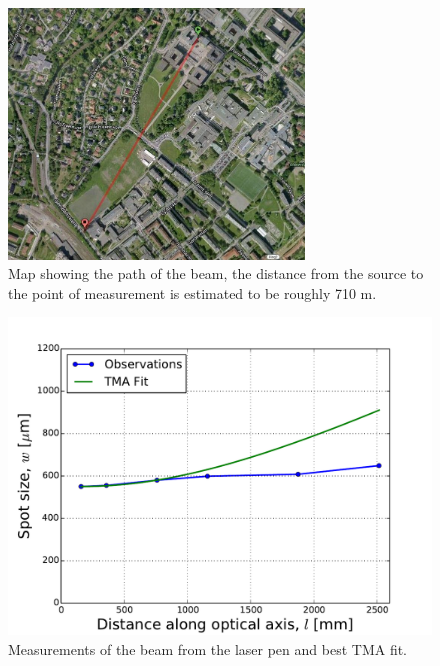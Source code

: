 \documentclass[a4paper, 11pt, notitlepage, english]{article}
\begin{document}
\begin{figure}[ht]
\centering
\includegraphics[width=0.7\textwidth]{map.jpg}  
\caption{Map showing the path of the beam, the distance from the source to the point of measurement is estimated to be roughly 710 m.\label{fig:map}}
\end{figure}

\begin{figure}[ht]
\centering
\includegraphics[width=\textwidth]{laserpenn_vh}  
\caption{Measurements of the beam from the laser pen and best TMA fit.  \label{fig:e3r1}}
\end{figure}
\end{document}
